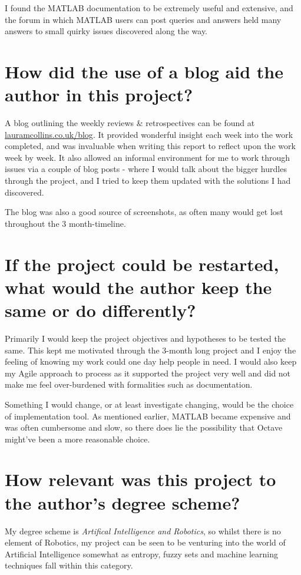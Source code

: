I found the MATLAB documentation to be extremely useful and extensive, and the forum in which MATLAB users can post queries and answers held many answers to small quirky issues discovered along the way.

\section{How did the use of a blog aid the author in this project?}
\label{sec:blog}

A blog outlining the weekly reviews \& retrospectives can be found at \url{lauramcollins.co.uk/blog}. It provided wonderful insight each week into the work completed, and was invaluable when writing this report to reflect upon the work week by week. It also allowed an informal environment for me to work through issues via a couple of  blog posts - where I would talk about the bigger hurdles through the project, and I tried to keep them updated with the solutions I had discovered.

The blog was also a good source of screenshots, as often many would get lost throughout the 3 month-timeline.

\section{If the project could be restarted, what would the author keep the same or do differently?}

Primarily I would keep the project objectives and hypotheses to be tested the same. This kept me motivated through the 3-month long project and I enjoy the feeling of knowing my work could one day help people in need. I would also keep my Agile approach to process as it supported the project very well and did not make me feel over-burdened with formalities such as documentation.

Something I would change, or at least investigate changing, would be the choice of implementation tool. As mentioned earlier, MATLAB became expensive and was often cumbersome and slow, so there does lie the possibility that Octave might've been a more reasonable choice.

\section{How relevant was this project to the author's degree scheme?}

My degree scheme is \textit{Artifical Intelligence and Robotics}, so whilst there is no element of Robotics, my project can be seen to be venturing into the world of Artificial Intelligence somewhat as entropy, fuzzy sets and machine learning techniques fall within this category.


